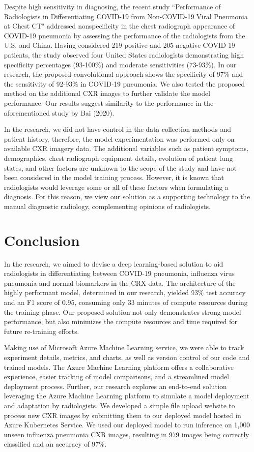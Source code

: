 \documentclass[12pt, twocolumn]{CUP-JNL-PPS}
\begin{document}
Despite high sensitivity in diagnosing, the recent study “Performance
of Radiologists in Differentiating COVID-19 from Non-COVID-19 Viral Pneumonia at Chest CT" addressed nonspecificity in the chest radiograph appearance of COVID-19 pneumonia by assessing the performance of the radiologists from the U.S. and China. Having considered 219 positive and 205 negative COVID-19 patients, the study observed four United States radiologists demonstrating high specificity percentages (93-100\%) and moderate sensitivities (73-93\%). In our research, the proposed convolutional approach shows the specificity of 97\% and
the sensitivity of 92-93\% in COVID-19 pneumonia. We also tested the proposed
method on the additional CXR images to further validate the model performance.
Our results suggest similarity to the performance in the aforementioned study by
Bai (2020).

In the research, we did not have control in the data collection methods and patient history, therefore, the model experimentation was performed only on available CXR imagery data. The additional variables such as patient symptoms, demographics, chest radiograph equipment details, evolution of patient lung states, and other factors are unknown to the scope of the study and have not been considered in the model training process. However, it is known that radiologists would leverage some or all of these factors when formulating a diagnosis. For this
reason, we view our solution as a supporting technology to the manual diagnostic
radiology, complementing opinions of radiologists.

\section{Conclusion}

In the research, we aimed to devise a deep learning-based solution to
aid radiologists in differentiating between COVID-19 pneumonia, influenza virus
pneumonia and normal biomarkers in the CRX data. The architecture of the
highly performant model, determined in our research, yielded 93\% test accuracy
and an F1 score of 0.95, consuming only 33 minutes of compute resources during
the training phase. Our proposed solution not only demonstrates strong model
performance, but also minimizes the compute resources and time required for
future re-training efforts.

Making use of Microsoft Azure Machine Learning service, we were able to track experiment details, metrics, and charts, as well as version control of our code and trained models. The Azure Machine Learning platform offers a collaborative experience, easier tracking of model comparisons, and a streamlined model deployment process. Further, our research explores an end-to-end solution leveraging the Azure Machine Learning platform to simulate a model deployment and adaptation by radiologists. We developed a simple file upload website to
process new CXR images by submitting them to our deployed model hosted in
Azure Kubernetes Service. We used our deployed model to run inference on 1,000
unseen influenza pneumonia CXR images, resulting in 979 images being correctly
classified and an accuracy of 97\%.
\end{document}
